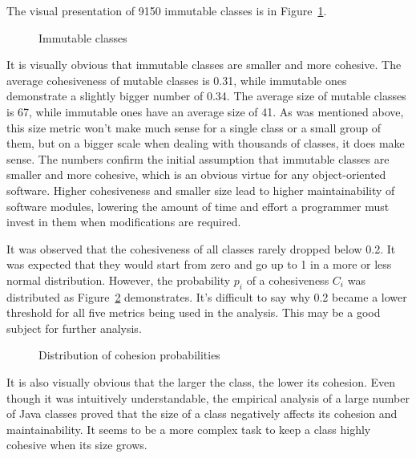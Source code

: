 \documentclass[sigconf,10pt,nonacm=true]{acmart}
\begin{document}
The visual presentation of 9150 immutable classes is in Figure~\ref{fig:2}.

\begin{figure}[h]
  
  \caption{Immutable classes}
  \label{fig:2}
\end{figure}

It is visually obvious that immutable classes are smaller and more cohesive.
The average cohesiveness of mutable classes is 0.31, while immutable
ones demonstrate a slightly bigger number of 0.34. The average size
of mutable classes is 67, while immutable ones have an average
size of 41. As was mentioned above, this size metric won't make much
sense for a single class or a small group of them, but on a bigger
scale when dealing with thousands of classes, it does make sense. The
numbers confirm the initial assumption that immutable classes are smaller
and more cohesive, which is an obvious virtue for any object-oriented
software. Higher cohesiveness and smaller size lead to higher maintainability
of software modules, lowering the amount of time and effort a programmer
must invest in them when modifications are required.

It was observed that the cohesiveness of all classes rarely dropped below
0.2. It was expected that they would start from zero and go up to 1
in a more or less normal distribution. However, the probability $p_i$ of
a cohesiveness $C_i$ was distributed as Figure~\ref{fig:3} demonstrates.
It's difficult to say why 0.2 became a lower threshold for all five
metrics being used in the analysis. This may be a good subject for further
analysis.

\begin{figure}[h]
  
  \caption{Distribution of cohesion probabilities}
  \label{fig:3}
\end{figure}

It is also visually obvious that the larger the class, the lower
its cohesion. Even though it was intuitively understandable, the empirical
analysis of a large number of Java classes proved that the size of a class
negatively affects its cohesion and maintainability. It seems to be a more
complex task to keep a class highly cohesive when its size grows.

\end{document}
